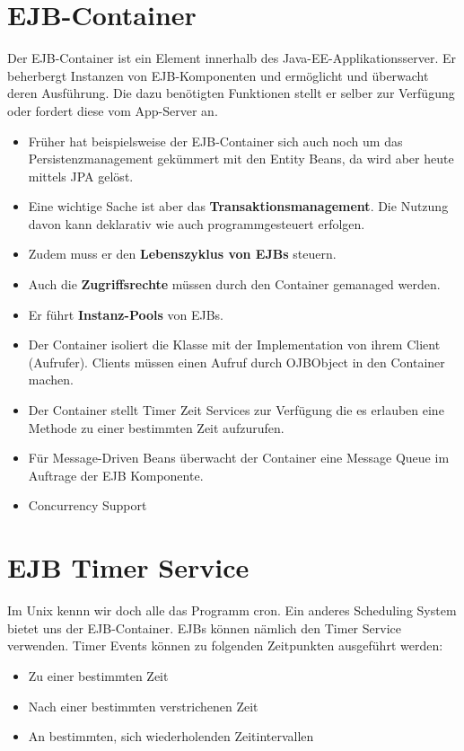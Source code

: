 \section{EJB-Container}
Der EJB-Container ist ein Element innerhalb des Java-EE-Applikationsserver. Er beherbergt Instanzen von EJB-Komponenten und ermöglicht und überwacht deren Ausführung. Die dazu benötigten Funktionen stellt er selber zur Verfügung oder fordert diese vom App-Server an.

\begin{itemize}
	\item Früher hat beispielsweise der EJB-Container sich auch noch um das Persistenzmanagement gekümmert mit den Entity Beans, da wird aber heute mittels JPA gelöst.
	\item Eine wichtige Sache ist aber das \textbf{Transaktionsmanagement}.  Die Nutzung davon kann deklarativ wie auch programmgesteuert erfolgen.
	\item Zudem muss er den \textbf{Lebenszyklus von EJBs} steuern.
	\item Auch die \textbf{Zugriffsrechte} müssen durch den Container gemanaged werden.
	\item Er führt \textbf{Instanz-Pools} von EJBs.
	\item Der Container isoliert die Klasse mit der Implementation von ihrem Client (Aufrufer). Clients müssen einen Aufruf durch OJBObject in den Container machen.
	\item Der Container stellt Timer Zeit Services zur Verfügung die es erlauben eine Methode zu einer bestimmten Zeit aufzurufen.
	\item Für Message-Driven Beans überwacht der Container eine Message Queue im  Auftrage der EJB Komponente. 
	\item Concurrency Support 
\end{itemize}

\section{EJB Timer Service}
Im Unix kennn wir doch alle das Programm cron. Ein anderes Scheduling System bietet uns der EJB-Container. EJBs können nämlich den Timer Service verwenden. Timer Events können zu folgenden Zeitpunkten ausgeführt werden:
\begin{itemize}
\item Zu einer bestimmten Zeit 
\item Nach einer bestimmten verstrichenen Zeit 
\item An bestimmten, sich wiederholenden Zeitintervallen 
\end{itemize}	

